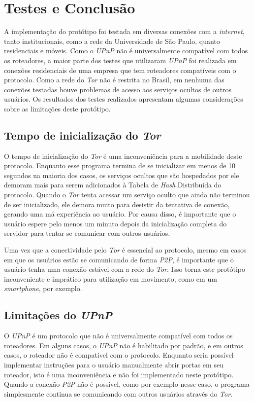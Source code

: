 \chapter{Testes e Conclusão}

A implementação do protótipo foi testada em diversas conexões com a \textit{internet}, tanto institucionais, como a rede da Universidade de São Paulo, quanto residenciais e móveis. Como o \textit{UPnP} não é universalmente compatível com todos os roteadores, a maior parte dos testes que utilizaram \textit{UPnP} foi realizada em conexões residenciais de uma empresa que tem roteadores compatíveis com o protocolo. Como a rede do \textit{Tor} não é restrita no Brasil, em nenhuma das conexões testadas houve problemas de acesso aos serviços ocultos de outros usuários. Os resultados dos testes realizados apresentam algumas considerações sobre as limitações deste protótipo.

\section{Tempo de inicialização do \textit{Tor}}

O tempo de inicialização do \textit{Tor} é uma inconveniência para a mobilidade deste protocolo. Enquanto esse programa termina de se inicializar em menos de 10 segundos na maioria dos casos, os serviços ocultos que são hospedados por ele demoram mais para serem adicionados à Tabela de \textit{Hash} Distribuída do protocolo. Quando o \textit{Tor} tenta acessar um serviço oculto que ainda não terminou de ser inicializado, ele demora muito para desistir da tentativa de conexão, gerando uma má experiência ao usuário. Por causa disso, é importante que o usuário espere pelo menos um minuto depois da inicialização completa do servidor para tentar se comunicar com outros usuários.

Uma vez que a conectividade pelo \textit{Tor} é essencial ao protocolo, mesmo em casos em que os usuários estão se comunicando de forma \textit{P2P}, é importante que o usuário tenha uma conexão estável com a rede do \textit{Tor}. Isso torna este protótipo inconveniente e imprático para utilização em movimento, como em um \textit{smartphone}, por exemplo.

\section{Limitações do \textit{UPnP}}

O \textit{UPnP} é um protocolo que não é universalmente compatível com todos os roteadores. Em alguns casos, o \textit{UPnP} não é habilitado por padrão, e em outros casos, o roteador não é compatível com o protocolo. Enquanto seria possível implementar instruções para o usuário manualmente abrir portas em seu roteador, isto é uma inconveniência e não foi implementado neste protótipo. Quando a conexão \textit{P2P} não é possível, como por exemplo nesse caso, o programa simplesmente continua se comunicando com outros usuários através do \textit{Tor}.

